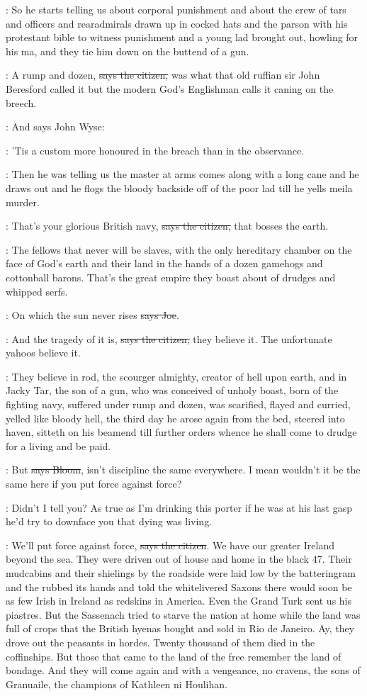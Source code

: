 \Nq:
So he starts telling us about corporal punishment and about the crew
of tars and officers and rearadmirals drawn up in cocked hats and the
parson with his protestant bible to witness punishment and a young lad
brought out, howling for his ma, and they tie him down on the buttend of a
gun.

\citizen:
A rump and dozen, \sout{says the citizen,}
was what that old ruffian sir John
Beresford called it but the modern God's Englishman calls it caning on the
breech.

\Nq:
And says John Wyse:

\johnwyse:
'Tis a custom more honoured in the breach
than in the observance.

\Nq:
Then he was telling us the master at arms comes along with a long
cane and he draws out and he flogs the bloody backside off of the poor lad
till he yells meila murder.

\citizen:
That's your glorious British navy,
\sout{says the citizen,}
that bosses the earth.

\citizen:
The fellows that never will be slaves,
with the only hereditary chamber on
the face of God's earth and their land in the hands of a dozen gamehogs
and cottonball barons. That's the great empire they boast about of drudges
and whipped serfs.

\joe:
On which the sun never rises \sout{says Joe}.

\citizen:
And the tragedy of it is, \sout{says the citizen,}
they believe it. The
unfortunate yahoos believe it.

:
They believe in rod, the scourger almighty, creator of hell upon earth,
and in Jacky Tar, the son of a gun, who was conceived of unholy boast,
born of the fighting navy, suffered under rump and dozen, was scarified,
flayed and curried, yelled like bloody hell, the third day he arose again
from the bed, steered into haven, sitteth on his beamend till further
orders whence he shall come to drudge for a living and be paid.

\Bloom:
But \sout{says Bloom},
isn't discipline the same everywhere. I mean wouldn't
it be the same here if you put force against force?

\Nq:
Didn't I tell you? As true as I'm drinking this porter if he was at his
last gasp he'd try to downface you that dying was living.

\citizen:
We'll put force against force, \sout{says the citizen}.
We have our greater
Ireland beyond the sea. They were driven out of house and home in the
black 47. Their mudcabins and their shielings by the roadside were laid
low by the batteringram and the  rubbed its hands and told the
whitelivered Saxons there would soon be as few Irish in Ireland as
redskins in America. Even the Grand Turk sent us his piastres. But the
Sassenach tried to starve the nation at home while the land was full of
crops that the British hyenas bought and sold in Rio de Janeiro. Ay, they
drove out the peasants in hordes. Twenty thousand of them died in the
coffinships. But those that came to the land of the free remember the
land of bondage. And they will come again and with a vengeance, no
cravens, the sons of Granuaile, the champions of Kathleen ni Houlihan.

